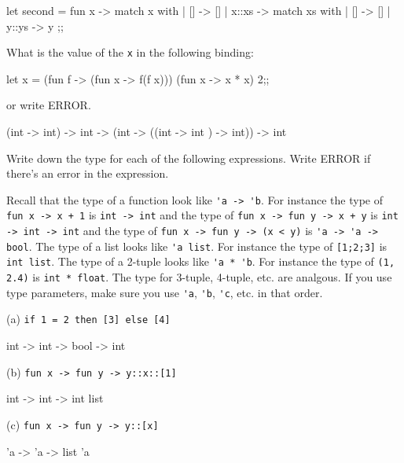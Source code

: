 \ANSWER
\begin{answercode}
  let second = fun x -> 
  match x with 
  | [] -> []
  | x::xs -> 
	match xs with 
	| [] -> []
	| y::ys -> y
  ;;
\end{answercode}

\newpage
\nextq
What is the value of the \verb!x! in the following binding:
\begin{console}
let x = (fun f -> (fun x -> f(f x))) (fun x -> x * x) 2;;
\end{console}
or write ERROR.

\ANSWER
\begin{answercode}
 (int -> int) -> int -> (int -> ((int -> int ) -> int)) -> int 
\end{answercode}

\newpage
\nextq
Write down the type for each of the following expressions.
Write ERROR if there's an error in the expression.
\begin{tightlist}
\li Recall that the type of a function look like
\verb!'a -> 'b!.    
For instance the type of \verb!fun x -> x + 1! is
\verb!int -> int! and the type of
\verb!fun x -> fun y -> x + y! is \verb!int -> int -> int!
and the type of
\verb!fun x -> fun y -> (x < y)! is \verb!'a -> 'a -> bool!.
\li The type of a list looks like \verb!'a list!.
For instance the type of \verb![1;2;3]! is
\verb!int list!.
\li The type of a 2-tuple looks like \verb!'a * 'b!.
For instance the type of \verb!(1, 2.4)! is
\verb!int * float!.
The type for 3-tuple, 4-tuple, etc. are analgous.
\li If you use type parameters, make sure you use \verb!'a!,
\verb!'b!, \verb!'c!, etc. in that order.
\end{tightlist}


(a) \verb!if 1 = 2 then [3] else [4]!
\\
\ANSWER
\begin{answercode}
int -> int -> bool -> int
\end{answercode}

(b) \verb!fun x -> fun y -> y::x::[1]!
\\
\ANSWER
\begin{answercode}
int -> int -> int list
\end{answercode}

(c) \verb!fun x -> fun y -> y::[x]!
\\
\ANSWER
\begin{answercode}
'a -> 'a -> list 'a
\end{answercode}

